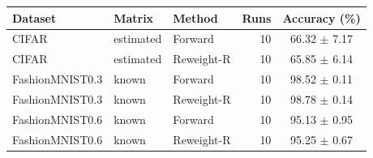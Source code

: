 \begin{tabular}{lllrc}
Dataset & Matrix & Method & Runs & Accuracy (\%) \\
\hline
CIFAR & estimated & Forward & 10 & 66.32 $\pm$ 7.17 \\
CIFAR & estimated & Reweight-R & 10 & 65.85 $\pm$ 6.14 \\
FashionMNIST0.3 & known & Forward & 10 & 98.52 $\pm$ 0.11 \\
FashionMNIST0.3 & known & Reweight-R & 10 & 98.78 $\pm$ 0.14 \\
FashionMNIST0.6 & known & Forward & 10 & 95.13 $\pm$ 0.95 \\
FashionMNIST0.6 & known & Reweight-R & 10 & 95.25 $\pm$ 0.67 \\
\end{tabular}
